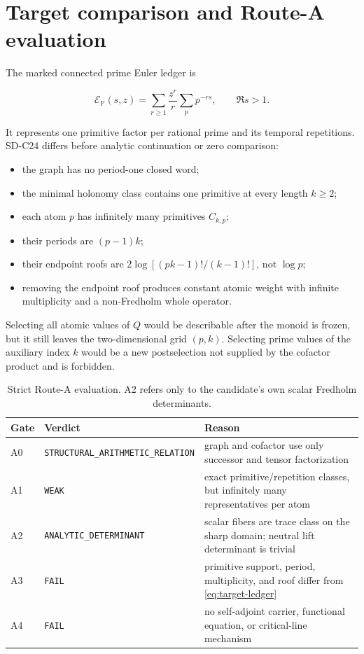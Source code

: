 \section{Target comparison and Route-A evaluation}
\label{sec:route}

The marked connected prime Euler ledger is

\begin{equation}
 \mathcal E_{\mathbb P}(s,z)=
 \sum_{r\ge1}\frac{z^r}{r}\sum_p p^{-rs},
 \qquad \Re s>1.
\label{eq:target-ledger}
\end{equation}

It represents one primitive factor per rational prime and its temporal
repetitions.  SD-C24 differs before analytic continuation or zero comparison:

\begin{itemize}
\item the graph has no period-one closed word;
\item the minimal holonomy class contains one primitive at every length
\(k\ge2\);
\item each atom \(p\) has infinitely many primitives \(C_{k,p}\);
\item their periods are \((p-1)k\);
\item their endpoint roofs are
\(2\log[(pk-1)!/(k-1)!]\), not \(\log p\);
\item removing the endpoint roof produces constant atomic weight with
infinite multiplicity and a non-Fredholm whole operator.
\end{itemize}

Selecting all atomic values of \(Q\) would be describable after the monoid is
frozen, but it still leaves the two-dimensional grid \((p,k)\).  Selecting
prime values of the auxiliary index \(k\) would be a new postselection not
supplied by the cofactor product and is forbidden.

\begin{table}[t]
\centering
\small
\caption{Strict Route-A evaluation.  A2 refers only to the candidate's own
scalar Fredholm determinants.}
\label{tab:route}
\begin{tabularx}{\textwidth}{L{0.12\textwidth}L{0.36\textwidth}Y}
\toprule
Gate & Verdict & Reason \\
\midrule
A0 & \texttt{STRUCTURAL\_ARITHMETIC\_RELATION}
& graph and cofactor use only successor and tensor factorization \\
A1 & \texttt{WEAK}
& exact primitive/repetition classes, but infinitely many representatives per atom \\
A2 & \texttt{ANALYTIC\_DETERMINANT}
& scalar fibers are trace class on the sharp domain; neutral lift determinant is trivial \\
A3 & \texttt{FAIL}
& primitive support, period, multiplicity, and roof differ from \cref{eq:target-ledger} \\
A4 & \texttt{FAIL}
& no self-adjoint carrier, functional equation, or critical-line mechanism \\
\bottomrule
\end{tabularx}
\end{table}

